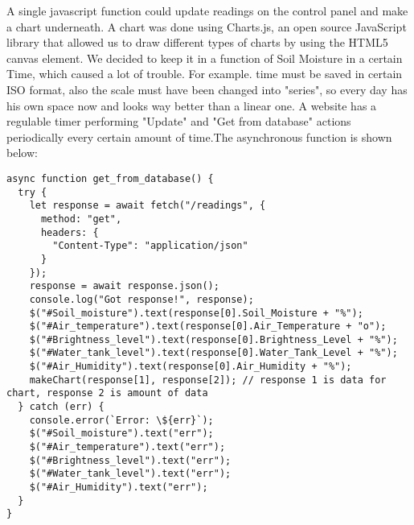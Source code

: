 \documentclass[oneside,a4paper,11pt]{report}
\begin{document}
A single javascript function could update readings on the control panel and make a chart underneath. A chart was done using Charts.js, an open source JavaScript library that allowed us to draw different types of charts by using the HTML5 canvas element. We decided to keep it in a function of Soil Moisture in a certain Time, which caused a lot of trouble. For example. time must be saved in certain ISO format, also the scale must have been changed into "series", so every day has his own space now and looks way better than a linear one. A website has a regulable timer performing "Update" and "Get from database" actions periodically every certain amount of time.The asynchronous function is shown below:
\begin{lstlisting}[style=JavaScript]
async function get_from_database() {
  try {
    let response = await fetch("/readings", {
      method: "get",
      headers: {
        "Content-Type": "application/json"
      }
    });
    response = await response.json();
    console.log("Got response!", response);
    $("#Soil_moisture").text(response[0].Soil_Moisture + "%");
    $("#Air_temperature").text(response[0].Air_Temperature + "o");
    $("#Brightness_level").text(response[0].Brightness_Level + "%");
    $("#Water_tank_level").text(response[0].Water_Tank_Level + "%");
    $("#Air_Humidity").text(response[0].Air_Humidity + "%");
    makeChart(response[1], response[2]); // response 1 is data for chart, response 2 is amount of data
  } catch (err) {
    console.error(`Error: \${err}`);
    $("#Soil_moisture").text("err");
    $("#Air_temperature").text("err");
    $("#Brightness_level").text("err");
    $("#Water_tank_level").text("err");
    $("#Air_Humidity").text("err");
  }
}
\end{lstlisting}\newpage
\end{document}
